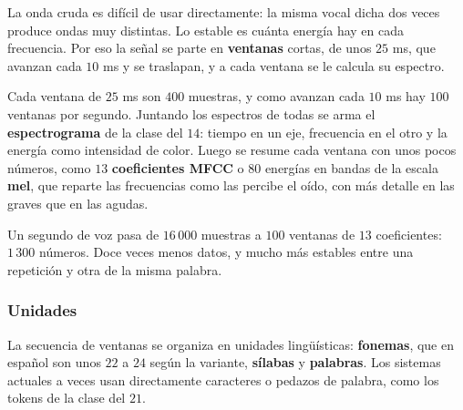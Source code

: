 \documentclass[11pt,letterpaper]{article}
\begin{document}
La onda cruda es difícil de usar directamente: la misma vocal dicha
dos veces produce ondas muy distintas. Lo estable es cuánta energía
hay en cada frecuencia. Por eso la señal se parte en
\textbf{ventanas} cortas, de unos $25$ ms, que avanzan cada $10$ ms y
se traslapan, y a cada ventana se le calcula su espectro.

\begin{center}
\end{center}

Cada ventana de $25$ ms son $400$ muestras, y como avanzan cada $10$
ms hay $100$ ventanas por segundo. Juntando los espectros de todas se
arma el \textbf{espectrograma} de la clase del $14$: tiempo en un eje,
frecuencia en el otro y la energía como intensidad de color. Luego se
resume cada ventana con unos pocos números, como $13$
\textbf{coeficientes MFCC} o $80$ energías en bandas de la escala
\textbf{mel}, que reparte las frecuencias como las percibe el oído,
con más detalle en las graves que en las agudas.

\begin{ejemplo}
    Un segundo de voz pasa de $16\,000$ muestras a $100$ ventanas de
    $13$ coeficientes: $1\,300$ números. Doce veces menos datos, y
    mucho más estables entre una repetición y otra de la misma
    palabra.
\end{ejemplo}

\subsubsection*{Unidades}

La secuencia de ventanas se organiza en unidades lingüísticas:
\textbf{fonemas}, que en español son unos $22$ a $24$ según la
variante, \textbf{sílabas} y \textbf{palabras}. Los sistemas actuales
a veces usan directamente caracteres o pedazos de palabra, como los
tokens de la clase del $21$.
\end{document}

